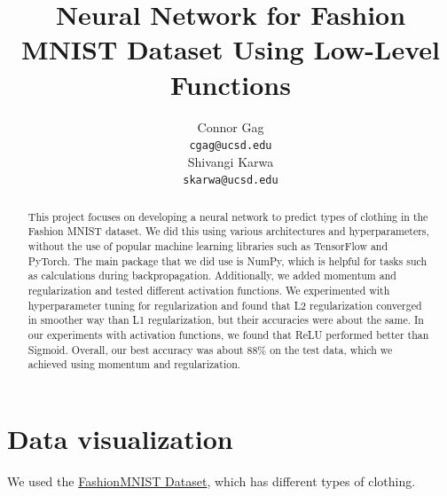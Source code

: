 \documentclass{article}
\title{Neural Network for Fashion MNIST Dataset Using Low-Level Functions}
\author{%
  Connor Gag \\
  \texttt{cgag@ucsd.edu} \\
  \And
  Shivangi Karwa \\
  \texttt{skarwa@ucsd.edu} \\
}
\begin{document}
\maketitle


\begin{abstract}
  This project focuses on developing a neural network to predict types of clothing in the Fashion MNIST dataset. We did this using various architectures and hyperparameters, without the use of popular machine learning libraries such as TensorFlow and PyTorch. The main package that we did use is NumPy, which is helpful for tasks such as calculations during backpropagation. Additionally, we added momentum and regularization and tested different activation functions. We experimented with hyperparameter tuning for regularization and found that L2 regularization converged in smoother way than L1 regularization, but their accuracies were about the same. In our experiments with activation functions, we found that ReLU performed better than Sigmoid. Overall, our best accuracy was about 88\% on the test data, which we achieved using momentum and regularization. 
\end{abstract}


\section{Data visualization}
We used the \href{https://www.kaggle.com/datasets/zalando-research/fashionmnist}{FashionMNIST Dataset}, which has different types of clothing.
\end{document}

